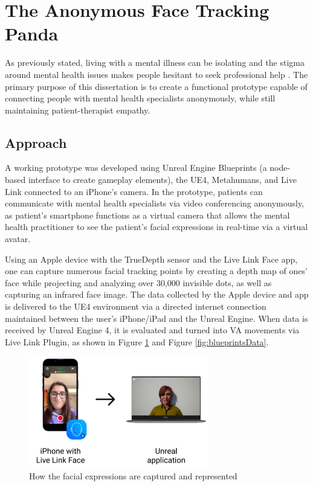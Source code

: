 \section{The Anonymous Face Tracking Panda} \label{chap:3}
As previously stated, living with a mental illness can be isolating and the stigma around mental health issues makes people hesitant to seek professional help \cite{HAM18}. The primary purpose of this dissertation is to create a functional prototype capable of connecting people with mental health specialists anonymously, while still maintaining patient-therapist empathy.

\subsection{Approach}
A working prototype was developed using Unreal Engine Blueprints (a node-based interface to create gameplay elements), the UE4, Metahumans, and Live Link connected to an iPhone's camera. In the prototype, patients can communicate with mental health specialists via video conferencing anonymously, as patient's smartphone functions as a virtual camera that allows the mental health practitioner to see the patient's facial expressions in real-time via a virtual avatar.

Using an Apple device with the TrueDepth sensor and the Live Link Face app, one can capture numerous facial tracking points by creating a depth map of ones’ face while projecting and analyzing over 30,000 invisible dots, as well as capturing an infrared face image. The data collected by the Apple device and app is delivered to the UE4 environment via a directed internet connection maintained between the user's iPhone/iPad and the Unreal Engine. When data is received by Unreal Engine 4, it is evaluated and turned into VA movements via Live Link Plugin, as shown in Figure \ref{fig:facialExpressions} and Figure \ref{fig:blueprintsData}.

\begin{figure}[!htb]
\includegraphics[width=0.7\textwidth]{figures/howItWorks.png}
\centering
\caption{How the facial expressions are captured and represented}
\label{fig:facialExpressions}
\end{figure}

